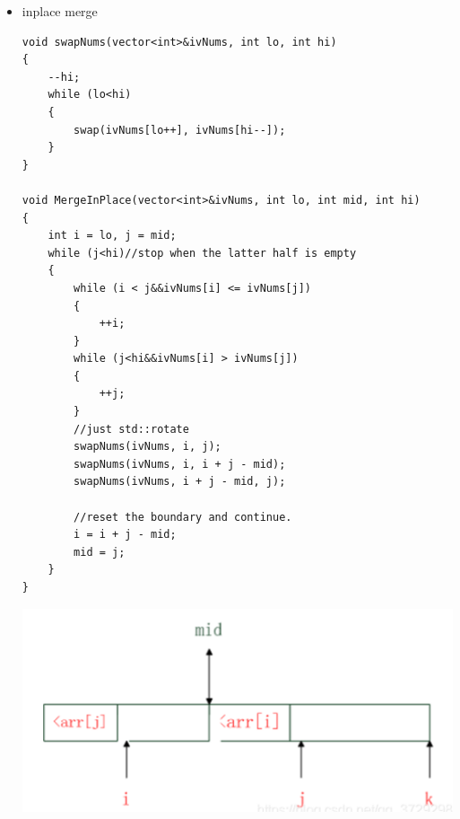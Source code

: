 \documentclass[a4paper,11pt,twoside]{book}
\begin{document}
\begin{itemize}
\item inplace merge
\begin{lstlisting}
void swapNums(vector<int>&ivNums, int lo, int hi)
{
	--hi;
	while (lo<hi)
	{
		swap(ivNums[lo++], ivNums[hi--]);
	}
}

void MergeInPlace(vector<int>&ivNums, int lo, int mid, int hi)
{
	int i = lo, j = mid;
	while (j<hi)//stop when the latter half is empty
	{
		while (i < j&&ivNums[i] <= ivNums[j])
		{
			++i;
		}
		while (j<hi&&ivNums[i] > ivNums[j])
		{
			++j;
		}
		//just std::rotate
		swapNums(ivNums, i, j);
		swapNums(ivNums, i, i + j - mid);
		swapNums(ivNums, i + j - mid, j);
		
		//reset the boundary and continue.
		i = i + j - mid;
		mid = j;
	}
}
\end{lstlisting}

\begin{center}
	\includegraphics[scale=0.45]{pics/inplace}
\end{center}

\end{itemize}
\end{document}
